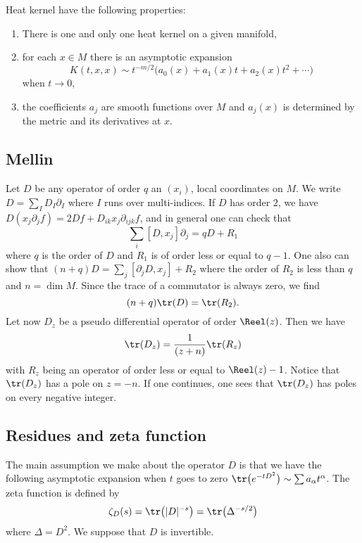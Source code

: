 \begin{theorem}
Heat kernel have the following properties:
\begin{enumerate}
\item There is one and only one heat kernel on a given manifold,
\item for each $x\in M$ there is an asymptotic expansion
\[ 
  K(t,x,x)\sim t^{-m/2}\big( a_0(x)+a_1(x)t+a_2(x)t^2+\cdots \big)
\]
when $t\to 0$,
\item the coefficients $a_j$ are smooth functions over $M$ and $a_j(x)$ is determined by the metric and its derivatives at $x$.
\end{enumerate}
\end{theorem}

\subsection{Mellin}


Let $D$ be any operator of order $q$ an $(x_i)$, local coordinates on $M$. We write $D=\sum_ID_I\partial_I$ where $I$ runs over multi-indices. If $D$ has order $2$, we have $D(x_j\partial_jf)=2Df+D_{ik}x_j\partial_{ijk}f$, and in general one can check that
\[ 
 \sum_i[D,x_j]\partial_j=qD+R_1
\]
where $q$ is the order of $D$ and $R_1$ is of order less or equal to $q-1$. One also can show that $(n+q)D=\sum_j[\partial_jD,x_j]+R_2$ where the order of $R_2$ is less than $q$ and $n=\dim M$. Since the trace of a commutator is always zero, we find
\begin{equation}
(n+q)\tr(D)=\tr(R_2).
\end{equation}
Let now $D_z$ be a pseudo differential operator of order $\Reel(z)$. Then we have
\[ 
  \tr(D_z)=\frac{1}{ (z+n) }\tr(R_z)
\]
with $R_z$ being an operator of order less or equal to $\Reel(z)-1$. Notice that $\tr(D_z)$ has a pole on $z=-n$. If one continues, one sees that $\tr(D_z)$ has poles on every negative integer.


\subsection{Residues and zeta function}

The main assumption we make about the operator $D$ is that we have the following asymptotic expansion when $t$ goes to zero $\tr\big( e^{-tD^2}\big)\sim \sum a_{\alpha}t^{\alpha}$. The zeta function is defined by 
\begin{equation}
\zeta_D(s)=\tr\big( | D |^{-s} \big)=\tr\big( \Delta^{-s/2} \big)
\end{equation}
where $\Delta=D^2$. We suppose that $D$ is invertible.

